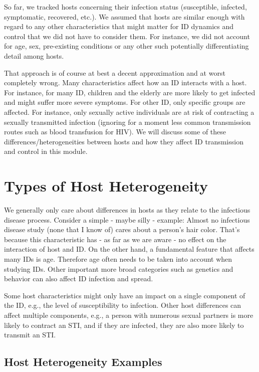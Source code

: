 \documentclass[]{book}
\theoremstyle{definition}
\theoremstyle{definition}
\theoremstyle{definition}
\theoremstyle{remark}
\begin{document}
So far, we tracked hosts concerning their infection status (susceptible,
infected, symptomatic, recovered, etc.). We assumed that hosts are
similar enough with regard to any other characteristics that might
matter for ID dynamics and control that we did not have to consider
them. For instance, we did not account for age, sex, pre-existing
conditions or any other such potentially differentiating detail among
hosts.

That approach is of course at best a decent approximation and at worst
completely wrong. Many characteristics affect how an ID interacts with a
host. For instance, for many ID, children and the elderly are more
likely to get infected and might suffer more severe symptoms. For other
ID, only specific groups are affected. For instance, only sexually
active individuals are at risk of contracting a sexually transmitted
infection (ignoring for a moment less common transmission routes such as
blood transfusion for HIV). We will discuss some of these
differences/heterogeneities between hosts and how they affect ID
transmission and control in this module.

\section{Types of Host Heterogeneity}\label{types-of-host-heterogeneity}

We generally only care about differences in hosts as they relate to the
infectious disease process. Consider a simple - maybe silly - example:
Almost no infectious disease study (none that I know of) cares about a
person's hair color. That's because this characteristic has - as far as
we are aware - no effect on the interaction of host and ID. On the other
hand, a fundamental feature that affects many IDs is age. Therefore age
often needs to be taken into account when studying IDs. Other important
more broad categories such as genetics and behavior can also affect ID
infection and spread.

Some host characteristics might only have an impact on a single
component of the ID, e.g., the level of susceptibility to infection.
Other host differences can affect multiple components, e.g., a person
with numerous sexual partners is more likely to contract an STI, and if
they are infected, they are also more likely to transmit an STI.

\subsection{Host Heterogeneity Examples}\label{myexamplebox}
\end{document}
